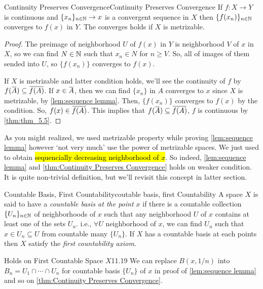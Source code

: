 \documentclass[12pt, a4paper, twoside]{article}
\newcommand{\overbar}[1]{\mkern 1.5mu\overline{\mkern-1.5mu#1\mkern-1.5mu}\mkern 1.5mu}
\theoremstyle{plain}
\begin{document}
\begin{thm}{Continuity Preserves Convergence}{Continuity Preserves Convergence}
    If $f: X \rightarrow Y$ is continuous and $\{x_n\}_{n \in {\mathbb {N}}} \rightarrow x$ is a convergent sequence in $X$ 
    then $\{f(x_n)\}_{n \in {\mathbb {N}}}$ converges to $f(x)$ in $Y$. 
    The converges holds if $X$ is metrizable. 
\end{thm}

\begin{proof}
    The preimage of neighborhood $U$ of $f(x)$ in $Y$ is neighborhood $V$ of $x$ in $X$, so we can find 
    $N \in {\mathbb {N}}$ such that $x_n \in N$ for $n \geq V$. So, all of images of them sended into $U$, so $\{f(x_n)\}$ converges to $f(x)$. 

    If $X$ is metrizable and latter condition holds, we'll see the continuity of $f$ by $f(\overbar{A}) \subseteq \overbar{f(A)}$. 
    If $x \in \overbar{A}$, then we can find $\{x_n\}$ in $A$ converges to $x$ since $X$ is metrizable, by \ref{lem:sequence lemma}. 
    Then, $\{f(x_n)\}$ converges to $f(x)$ by the condition. So, $f(x) \in \overbar{f(A)}$. This implies that 
    $f(\overbar{A}) \subseteq \overbar{f(A)}$, $f$ is continuous by \ref{thm:thm_5.5}. 
\end{proof}

As you might realized, we used metrizable property while proving \ref{lem:sequence lemma} however 
\lq not very much' use the power of metrizable spaces. We just used to obtain \hl{sequencially decreasing neighborhood of $x$}. 
So indeed, \ref{lem:sequence lemma} and \ref{thm:Continuity Preserves Convergence} holds on weaker condition. 
It is quite non-trivial definition, but we'll revisit this concept in latter section. 

\begin{defn}{Countable Basis, First Countability}{coutable basis, first Countability}
    A space $X$ is said to have a \textit{countable basis at the point $x$} if there is a countable collection 
    $\{U_n\}_{n \in {\mathbb {N}}}$ of neighborhoods of $x$ such that any neighborhood $U$ of $x$ contains at least one of the sets $U_n$. 
    i.e., $\forall U$ neighborhood of $x$, we can find $U_n$ such that $x \in U_n \subseteq U$ from countable many $\{U_n\}$. 
    If $X$ has a countable basis at each points then $X$ satisfy the \textit{first countability axiom}. 
\end{defn}

\begin{rem}{Holds on First Countable Space $X$}{11.19}
    We can replace $B(x, 1/n)$ into $B_n = U_1 \cap \cdots \cap U_n$ for countable basis $\{U_n\}$ of $x$ 
    in proof of \ref{lem:sequence lemma} and so on \ref{thm:Continuity Preserves Convergence}. 
\end{rem}
\end{document}
